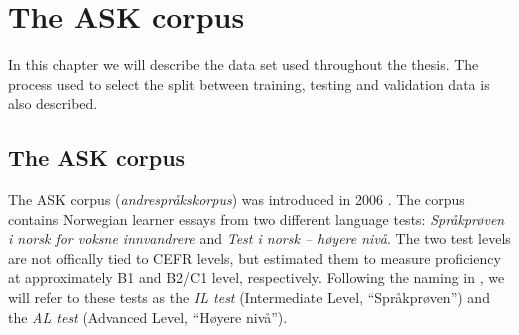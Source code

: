 \chapter{The ASK corpus} \label{ch:dataset}

In this chapter we will describe the data set used throughout the thesis. The
process used to select the split between training, testing and validation
data is also described.


\section{The ASK corpus}

The ASK corpus (\emph{andrespråkskorpus}) was introduced in 2006
\autocite{tenfjord06}. The corpus contains Norwegian learner essays from two
different language tests: \emph{Språkprøven i norsk for voksne innvandrere}
and \emph{Test i norsk – høyere nivå}. The two test levels are not offically
tied to \ac{CEFR} levels, but \textcite{carlsen2012proficiency} estimated
them to measure proficiency at approximately B1 and B2/C1 level,
respectively. Following the naming in \textcite{carlsen2012proficiency}, we
will refer to these tests as the \emph{IL test} (Intermediate Level,
``Språkprøven'') and the \emph{AL test} (Advanced Level, ``Høyere nivå'').

